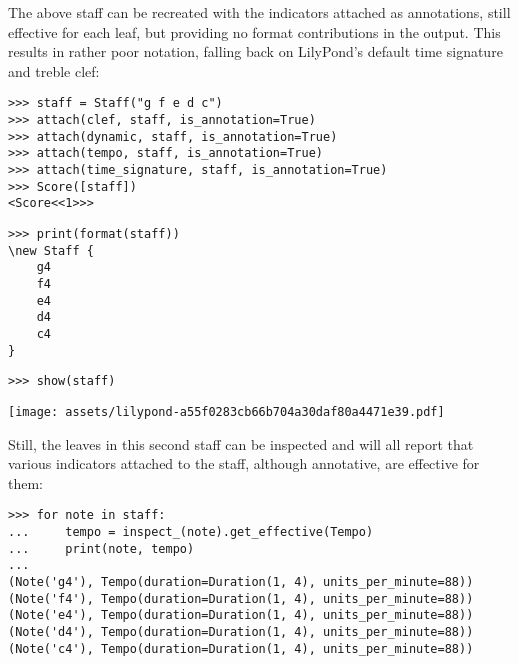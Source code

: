 \noindent The above staff can be recreated with the indicators attached as
annotations, still effective for each leaf, but providing no format
contributions in the output. This results in rather poor notation, falling back
on LilyPond's default  time signature and treble clef:

\begin{comment}
<abjad>
staff = Staff("g f e d c")
attach(clef, staff, is_annotation=True)
attach(dynamic, staff, is_annotation=True)
attach(tempo, staff, is_annotation=True)
attach(time_signature, staff, is_annotation=True)
Score([staff])
print(format(staff))
show(staff)
</abjad>
\end{comment}

\begin{abjadbookoutput}
\begin{singlespacing}
\vspace{-0.5\baselineskip}
\begin{lstlisting}
>>> staff = Staff("g f e d c")
>>> attach(clef, staff, is_annotation=True)
>>> attach(dynamic, staff, is_annotation=True)
>>> attach(tempo, staff, is_annotation=True)
>>> attach(time_signature, staff, is_annotation=True)
>>> Score([staff])
<Score<<1>>>
\end{lstlisting}
\begin{lstlisting}
>>> print(format(staff))
\new Staff {
    g4
    f4
    e4
    d4
    c4
}
\end{lstlisting}
\begin{lstlisting}
>>> show(staff)
\end{lstlisting}
\noindent\texttt{[image: assets/lilypond-a55f0283cb66b704a30daf80a4471e39.pdf]}
\end{singlespacing}
\end{abjadbookoutput}

\noindent Still, the leaves in this second staff can be inspected and will all
report that various indicators attached to the staff, although annotative, are
effective for them:

\begin{comment}
<abjad>
for note in staff:
    tempo = inspect_(note).get_effective(Tempo)
    print(note, tempo)

</abjad>
\end{comment}

\begin{abjadbookoutput}
\begin{singlespacing}
\vspace{-0.5\baselineskip}
\begin{lstlisting}
>>> for note in staff:
...     tempo = inspect_(note).get_effective(Tempo)
...     print(note, tempo)
...
(Note('g4'), Tempo(duration=Duration(1, 4), units_per_minute=88))
(Note('f4'), Tempo(duration=Duration(1, 4), units_per_minute=88))
(Note('e4'), Tempo(duration=Duration(1, 4), units_per_minute=88))
(Note('d4'), Tempo(duration=Duration(1, 4), units_per_minute=88))
(Note('c4'), Tempo(duration=Duration(1, 4), units_per_minute=88))
\end{lstlisting}
\end{singlespacing}
\end{abjadbookoutput}

